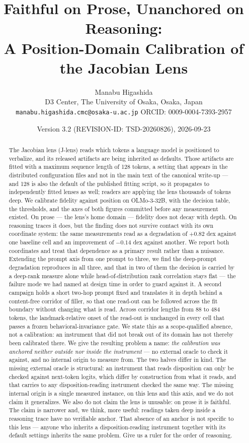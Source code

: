 \documentclass[11pt]{article}
\title{\bfseries Faithful on Prose, Unanchored on Reasoning:\\
A Position-Domain Calibration of the Jacobian Lens}
\author{Manabu Higashida\\
\small D3 Center, The University of Osaka, Osaka, Japan\\
\small \texttt{manabu.higashida.cmc@osaka-u.ac.jp} \quad ORCID: 0009-0004-7393-2957}
\date{\small Version 3.2 (REVISION-ID: TSD-20260826), 2026-09-23}
\begin{document}
\maketitle

\begin{abstract}
\noindent
The Jacobian lens (J-lens) reads which tokens a language model is
positioned to verbalize, and its released artifacts are being inherited
as defaults. Those artifacts are fitted with a maximum sequence length of
128 tokens, a setting that appears in the distributed configuration files
and not in the main text of the canonical write-up --- and 128 is also the
default of the published fitting script, so it propagates to independently
fitted lenses as well; readers are applying the lens
thousands of tokens deep. We calibrate fidelity against position on
OLMo-3-32B, with the decision table, the thresholds, and the axes of both
figures committed before any measurement existed. On prose --- the lens's
home domain --- fidelity does not decay with depth. On reasoning traces
it does, but the finding does not survive contact with its own
coordinate system: the same measurements read as a degradation of
$+0.82$ dex against one baseline cell and an improvement of $-0.14$ dex
against another. We report both coordinates and treat that dependence as
a primary result rather than a nuisance. Extending the prompt axis from
one prompt to three, we find the deep-prompt degradation reproduces in
all three, and that in two of them the decision is carried by a
deep-rank measure alone while head-of-distribution rank correlation
stays flat --- the failure mode we had named at design time in order to
guard against it. A second campaign holds a short two-hop prompt fixed and translates it in depth behind a content-free corridor of filler, so that one read-out can be followed across the fit boundary without changing what is read. Across corridor lengths from 88 to 484 tokens, the landmark-relative onset of the read-out is unchanged in every cell that passes a frozen behavioral-invariance gate. We state this as a scope-qualified absence, not a calibration: an instrument that did not break out of its domain has not thereby been calibrated there. We give the resulting problem a name: \emph{the
calibration was anchored neither outside nor inside the instrument} ---
no external oracle to check it against, and no internal origin to
measure from. The two halves differ in kind. The missing external oracle
is structural: an instrument that reads disposition can only be checked
against next-token logits, which differ by construction from what it
reads, and that carries to any disposition-reading instrument checked the
same way. The
missing internal origin is a single measured instance, on this lens and
this axis, and we do not claim it generalizes. We also do not claim the
lens is unusable: on prose it is faithful. The claim is narrower and, we
think, more useful: readings taken deep inside a reasoning trace have no
verifiable anchor. That absence of an anchor is not specific to this
lens --- anyone
who inherits a disposition-reading instrument together with its default
settings inherits the same problem. Give us a ruler for the order of
reasoning.
\end{abstract}
\end{document}
